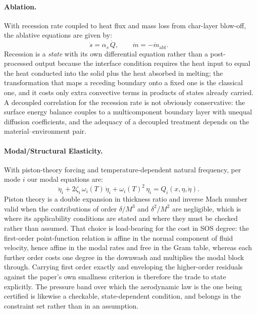 \paragraph{Ablation.}
With recession rate coupled to heat flux and mass loss from char-layer
blow-off, the ablative equations are given by:
\begin{equation}
\label{eq:ablation}
\dot s = \alpha_s \,\dot Q, \qquad \dot m = -\dot m_\text{abl}.
\end{equation}
Recession is a \emph{state} with its own differential equation rather than a
post-processed output because the interface condition requires the heat input to
equal the heat conducted into the solid plus the heat absorbed in melting; the
transformation that maps a receding boundary onto a fixed one is the classical
one, and it costs only extra convective terms in products of states already
carried\parencite{landau1950heat}.
A decoupled correlation for the recession rate is not obviously conservative: the
surface energy balance couples to a multicomponent boundary layer with unequal
diffusion coefficients, and the adequacy of a decoupled treatment depends on the
material--environment pair\parencite{kendall1967multicomponent}.

\paragraph{Modal/Structural Elasticity.}
With piston-theory forcing and temperature-dependent natural frequency, per
mode $i$ our modal equations are:
\begin{equation}
\label{eq:modal}
\ddot\eta_i + 2\zeta_i\,\omega_i(T)\,\dot\eta_i + \omega_i(T)^2\,\eta_i
= Q_i(x, \eta, \dot\eta).
\end{equation}
Piston theory is a double expansion in thickness ratio and inverse Mach number
valid when the contributions of order $\delta/M^3$ and $\delta^2/M^2$ are
negligible, which is where its applicability conditions are stated and where
they must be checked rather than assumed\parencite{ashley1956piston}.
That choice is load-bearing for the cost in SOS degree: the first-order
point-function relation is affine in the normal component of fluid velocity, hence
affine in the modal rates and free in the Gram table, whereas each further order
costs one degree in the downwash and multiplies the modal block through.
Carrying first order exactly and enveloping the higher-order residuals against the
paper's own smallness criterion is therefore the trade to state explicitly.
The pressure band over which the aerodynamic law is the one being certified is
likewise a checkable, state-dependent condition, and belongs in the constraint
set rather than in an assumption\parencite{lighthill1953oscillating}.

